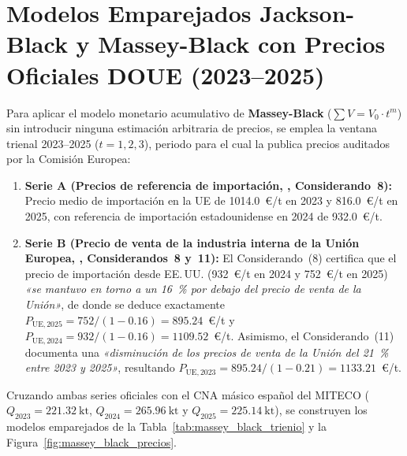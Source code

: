 \documentclass{report}
\begin{document}
\section{Modelos Emparejados Jackson-Black y Massey-Black con Precios Oficiales DOUE (2023--2025)}
Para aplicar el modelo monetario acumulativo de \textbf{Massey-Black} ($\sum V = V_0 \cdot t^m$) sin introducir ninguna estimación arbitraria de precios, se emplea la ventana trienal 2023--2025 ($t = 1, 2, 3$), periodo para el cual la \textcite[Considerandos~8 y~11]{DOUE2026} publica precios auditados por la Comisión Europea:
\begin{enumerate}
    \item \textbf{Serie A (Precios de referencia de importación, \cite{DOUE2026}, Considerando~8):} Precio medio de importación en la UE de \num{1014.0}~€/t en 2023 y \num{816.0}~€/t en 2025, con referencia de importación estadounidense en 2024 de \num{932.0}~€/t.
    \item \textbf{Serie B (Precio de venta de la industria interna de la Unión Europea, \cite{DOUE2026}, Considerandos~8 y~11):} El Considerando~(8) certifica que el precio de importación desde EE.\,UU. (\num{932}~€/t en 2024 y \num{752}~€/t en 2025) \textit{«se mantuvo en torno a un \SI{16}{\percent} por debajo del precio de venta de la Unión»}, de donde se deduce exactamente $P_{\text{UE},2025} = 752 / (1 - 0.16) = \num{895.24}$~€/t y $P_{\text{UE},2024} = 932 / (1 - 0.16) = \num{1109.52}$~€/t. Asimismo, el Considerando~(11) documenta una \textit{«disminución de los precios de venta de la Unión del \SI{21}{\percent} entre 2023 y 2025»}, resultando $P_{\text{UE},2023} = 895.24 / (1 - 0.21) = \num{1133.21}$~€/t.
\end{enumerate}

Cruzando ambas series oficiales con el CNA másico español del MITECO ($Q_{2023} = \SI{221.32}{\kilo\tonne}$, $Q_{2024} = \SI{265.96}{\kilo\tonne}$ y $Q_{2025} = \SI{225.14}{\kilo\tonne}$), se construyen los modelos emparejados de la Tabla~\ref{tab:massey_black_trienio} y la Figura~\ref{fig:massey_black_precios}.
\end{document}
